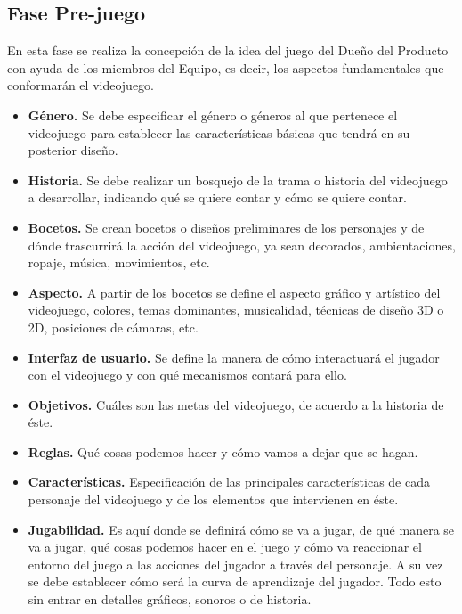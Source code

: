 \documentclass[a4paper, openright, 12pt]{report}
\begin{document}
\subsection*{Fase Pre-juego}
\justify
En esta fase se realiza la concepción de la idea del juego del Dueño del Producto con ayuda de los miembros del Equipo, es decir, los aspectos fundamentales que conformarán el videojuego. \cite{Implementacion2011}
\begin{itemize}
\item \textbf{Género.} Se debe especificar el género o géneros al que pertenece el videojuego para establecer las características básicas que tendrá en su posterior diseño. \cite{Implementacion2011}
\item \textbf{Historia.} Se debe realizar un bosquejo de la trama o historia del videojuego a desarrollar, indicando qué se quiere contar y cómo se quiere contar. \cite{Implementacion2011}
\item \textbf{Bocetos.} Se crean bocetos o diseños preliminares de los personajes y de dónde trascurrirá la acción del videojuego, ya sean decorados, ambientaciones, ropaje, música, movimientos, etc. \cite{Implementacion2011}
\item \textbf{Aspecto.} A partir de los bocetos se define el aspecto gráfico y artístico del videojuego, colores, temas dominantes, musicalidad, técnicas de diseño 3D o 2D, posiciones de cámaras, etc. \cite{Implementacion2011}
\item \textbf{Interfaz de usuario.} Se define la manera de cómo interactuará el jugador con el videojuego y con qué mecanismos contará para ello. \cite{Implementacion2011}
\item \textbf{Objetivos.} Cuáles son las metas del videojuego, de acuerdo a la historia de éste. \cite{Implementacion2011}
\item \textbf{Reglas.} Qué cosas podemos hacer y cómo vamos a dejar que se hagan. \cite{Implementacion2011} 
\item \textbf{Características.} Especificación de las principales características de cada personaje del videojuego y de los elementos que intervienen en éste. \cite{Implementacion2011}  
\item \textbf{Jugabilidad.} Es aquí donde se definirá cómo se va a jugar, de qué manera se va a jugar, qué cosas podemos hacer en el juego y cómo va reaccionar el entorno del juego a las acciones del jugador a través del personaje. A su vez se debe establecer cómo será la curva de aprendizaje del jugador. Todo esto sin entrar en detalles gráficos, sonoros o de historia. \cite{Implementacion2011} 

\end{itemize}
\end{document}
